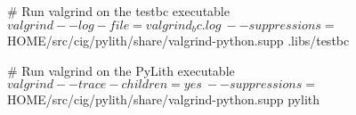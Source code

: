 \begin{shell}
# Run valgrind on the testbc executable
$ valgrind --log-file=valgrind_bc.log \
  --suppressions=$HOME/src/cig/pylith/share/valgrind-python.supp .libs/testbc

# Run valgrind on the PyLith executable
$ valgrind --trace-children=yes \
  --suppressions=$HOME/src/cig/pylith/share/valgrind-python.supp pylith
\end{shell}



